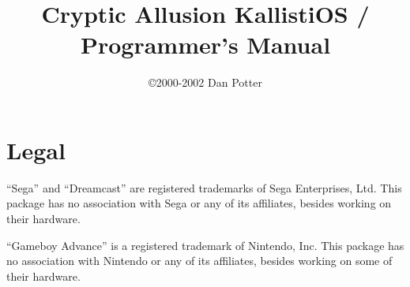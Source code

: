 \documentclass[english]{report}
\begin{document}


\newcommand{\funcname}[1]{%
	\texttt{#1}%
}

\newcommand{\progname}[1]{%
	\textbf{#1}%
}

\newcommand{\dirname}[1]{%
	\textbf{#1}%
}

\newcommand{\paramname}[1]{%
	\textit{#1}%
}

\newcommand{\dtname}[1]{%
	\textit{#1}%
}

\newcommand{\libname}[1]{%
	\textbf{#1}%
}

\newcommand{\code}[1]{%
	\texttt{#1}%
}

\newcommand{\constname}[1]{%
	\texttt{#1}%
}

\newcommand{\tm}[0]{ (tm) }

\newcommand{\kosversion}{ 1.1.8 }


\title{Cryptic Allusion KallistiOS / Programmer's Manual}
\author{\copyright 2000-2002 Dan Potter}

\maketitle
\tableofcontents{}


\chapter*{Legal}

``Sega'' and ``Dreamcast'' are registered trademarks of Sega
Enterprises, Ltd. This package has no association with Sega or any
of its affiliates, besides working on their hardware.

``Gameboy Advance'' is a registered trademark of Nintendo, Inc.
This package has no association with Nintendo or any of its affiliates,
besides working on some of their hardware.
\end{document}
